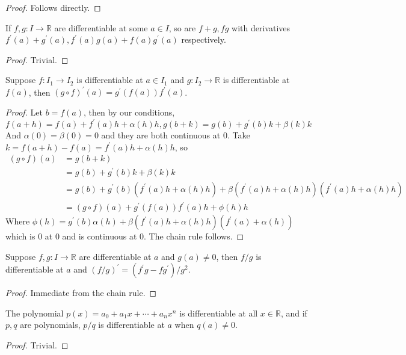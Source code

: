 \begin{proof}
    Follows directly.
\end{proof}
\begin{proposition}
    If $f,g:I\to\mathbb R$ are differentiable at some $a\in I$, so are $f+g,fg$ with derivatives $f^\prime(a)+g^\prime(a),f^\prime(a)g(a)+f(a)g^\prime(a)$ respectively.
\end{proposition}
\begin{proof}
    Trivial.
\end{proof}
\begin{theorem}
    Suppose $f:I_1\to I_2$ is differentiable at $a\in I_1$ and $g:I_2\to\mathbb R$ is differentiable at $f(a)$, then $(g\circ f)^\prime(a)=g^\prime(f(a))f^\prime(a)$.
\end{theorem}
\begin{proof}
    Let $b=f(a)$, then by our conditions,
    $$f(a+h)=f(a)+f^\prime(a)h+\alpha(h)h,g(b+k)=g(b)+g^\prime(b)k+\beta(k)k$$
    And $\alpha(0)=\beta(0)=0$ and they are both continuous at $0$.
    Take $k=f(a+h)-f(a)=f^\prime(a)h+\alpha(h)h$, so
    \begin{align*}
        (g\circ f)(a)&=g(b+k)\\
        &=g(b)+g^\prime(b)k+\beta(k)k\\
        &=g(b)+g^\prime(b)(f^\prime(a)h+\alpha(h)h)+\beta(f^\prime(a)h+\alpha(h)h)(f^\prime(a)h+\alpha(h)h)\\
        &=(g\circ f)(a)+g^\prime(f(a))f^\prime(a)h+\phi(h)h
    \end{align*}
    Where $\phi(h)=g^\prime(b)\alpha(h)+\beta(f^\prime(a)h+\alpha(h)h)(f^\prime(a)+\alpha(h))$ which is $0$ at $0$ and is continuous at $0$.
    The chain rule follows.
\end{proof}
\begin{corollary}
    Suppose $f,g:I\to\mathbb R$ are differentiable at $a$ and $g(a)\neq 0$, then $f/g$ is differentiable at $a$ and $(f/g)^\prime=(f^\prime g-fg^\prime)/g^2$.
\end{corollary}
\begin{proof}
    Immediate from the chain rule.
\end{proof}
\begin{corollary}
    The polynomial $p(x)=a_0+a_1x+\cdots+a_nx^n$ is differentiable at all $x\in\mathbb R$, and if $p,q$ are polynomials, $p/q$ is differentiable at $a$ when $q(a)\neq 0$.
\end{corollary}
\begin{proof}
    Trivial.
\end{proof}
